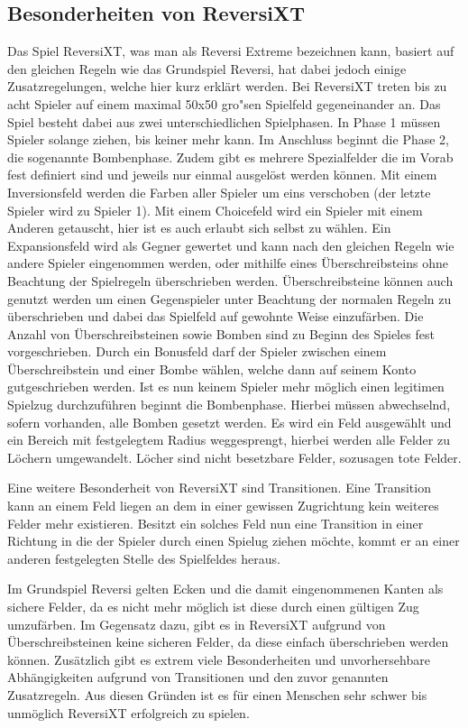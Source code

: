 \subsection{Besonderheiten von ReversiXT}\label{subsec:besonderheiten-von-reversixt}
Das Spiel ReversiXT, was man als Reversi Extreme bezeichnen kann, basiert auf den gleichen Regeln wie das Grundspiel Reversi, hat dabei jedoch einige Zusatzregelungen, welche hier kurz erkl\"art werden.
Bei ReversiXT treten bis zu acht Spieler auf einem maximal 50x50 gro"sen Spielfeld gegeneinander an.
Das Spiel besteht dabei aus zwei unterschiedlichen Spielphasen.
In Phase 1 m\"ussen Spieler solange ziehen, bis keiner mehr kann.
Im Anschluss beginnt die Phase 2, die sogenannte Bombenphase.
Zudem gibt es mehrere Spezialfelder die im Vorab fest definiert sind und jeweils nur einmal ausgel\"ost werden k\"onnen.
Mit einem Inversionsfeld werden die Farben aller Spieler um eins verschoben (der letzte Spieler wird zu Spieler 1).
Mit einem Choicefeld wird ein Spieler mit einem Anderen getauscht, hier ist es auch erlaubt sich selbst zu w\"ahlen.
Ein Expansionsfeld wird als Gegner gewertet und kann nach den gleichen Regeln wie andere Spieler eingenommen werden, oder mithilfe eines \"Uberschreibsteins ohne Beachtung der Spielregeln \"uberschrieben werden.
\"Uberschreibsteine k\"onnen auch genutzt werden um einen Gegenspieler unter Beachtung der normalen Regeln zu \"uberschrieben und dabei das Spielfeld auf gewohnte Weise einzuf\"arben.
Die Anzahl von \"Uberschreibsteinen sowie Bomben sind zu Beginn des Spieles fest vorgeschrieben.
Durch ein Bonusfeld darf der Spieler zwischen einem \"Uberschreibstein und einer Bombe w\"ahlen, welche dann auf seinem Konto gutgeschrieben werden.
Ist es nun keinem Spieler mehr m\"oglich einen legitimen Spielzug durchzuf\"uhren beginnt die Bombenphase.
Hierbei m\"ussen abwechselnd, sofern vorhanden, alle Bomben gesetzt werden.
Es wird ein Feld ausgew\"ahlt und ein Bereich mit festgelegtem Radius weggesprengt, hierbei werden alle Felder zu L\"ochern umgewandelt.
L\"ocher sind nicht besetzbare Felder, sozusagen tote Felder.

Eine weitere Besonderheit von ReversiXT sind Transitionen.
Eine Transition kann an einem Feld liegen an dem in einer gewissen Zugrichtung kein weiteres Felder mehr existieren.
Besitzt ein solches Feld nun eine Transition in einer Richtung in die der Spieler durch einen Spielug ziehen m\"ochte, kommt er an einer anderen festgelegten Stelle des Spielfeldes heraus.

Im Grundspiel Reversi gelten Ecken und die damit eingenommenen Kanten als sichere Felder, da es nicht mehr m\"oglich ist diese durch einen g\"ultigen Zug umzuf\"arben.
Im Gegensatz dazu, gibt es in ReversiXT aufgrund von \"Uberschreibsteinen keine sicheren Felder, da diese einfach \"uberschrieben werden k\"onnen.
Zus\"atzlich gibt es extrem viele Besonderheiten und unvorhersehbare Abh\"angigkeiten aufgrund von Transitionen und den zuvor genannten Zusatzregeln.
Aus diesen Gr\"unden ist es f\"ur einen Menschen sehr schwer bis unm\"oglich ReversiXT erfolgreich zu spielen.

